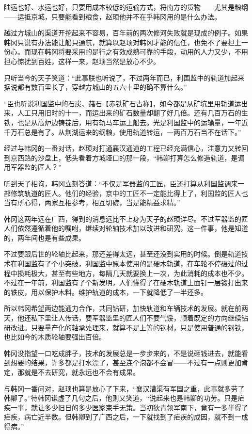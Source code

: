 陆运也好、水运也好，只要用成本较低的运输方式，将南方的货物——尤其是粮纲——运抵京城，只要能看到粮食，赵顼他并不在乎韩冈用的是什么办法。

越过方城山的渠道开挖起来不容易，百年前的两次修河失败就是现成的例子。如果韩冈只说有办法能让船只通航，就算以赵顼对韩冈才能的信任，也免不了要担上一份心。而现在韩冈将要采用的是行之有效成熟可靠的手段，动用的人力又少，不用担心惊扰到百姓，这样一来，赵顼当然是放心不少。

只听当今的天子笑道：“此事朕也听说了，不过两年而已，利国监中的轨道加起来据说都有数百里长了，穿越方城山的五六十里的确不算什么。”

“臣也听说利国监中的石炭、赭石【赤铁矿石古称】，如今都是从矿坑里用轨道运出来，人工只用旧时的十一，而运出来的矿石数量却翻了好几倍。还有几百万石的生铁，也是从高炉边铸锭后，用有轨马车运上船去。光是利国监中的运输量，一年近千万石总是有了。从荆湖运来的纲粮，使用轨道转运，一两百万石当不在话下。”

经过与韩冈的一番对话，赵顼对打通襄汉通道的工程已经充满信心，注意力又转回到京西路的沙盘上，低头看着方城垭口的那一段，“韩卿打算怎么修造轨道，是调用军器监的匠人？”

听到天子相询，韩冈立刻答道：“不仅是军器监的工匠，臣还打算从利国监调来一部修筑轨道的匠人。他们的经验，京中的工匠不一定能比得上了，利国监的匠人也当有所心得，两家互相参考，相互切磋，当是能精益求精。”

韩冈这两年远在广西，得到的消息远比不上身为天子的赵顼详尽。不过军器监的匠人们依然遵循着他的嘱咐，继续对轮轴技术加以改进和研究，这一件事，他是知道的，两年间也是有些成果。

不过要跟后世的轮轴比起来，那还差得太远，甚至还没到实用的时候。倒是轨道技术在利国监有了个小突破，利国监中原本使用的是硬木轨道，在车轮不停碾过的过程中损耗极大，甚至有些地方，每隔几天就要换上一次，为此消耗的成本也不少。不过在一年前，利国监有了个新发明，人们懂得了在硬木轨道上面钉一层锻打出来的铁皮，用以保护木料。维护轨道的成本，一下就降低了一半还多。

所以韩冈希望两边能通力合作，共同钻研，加快轨道和车辆技术的发展。就在前两天，他还私下里让人传话，要军器监里的匠人们不要气馁，顺着既定的方向继续钻研改进。只要量产化的轴承处理来，就算不是上等的钢材，只是使用普通的钢铁，也比如今的木质轮轴要强出百倍。

韩冈没指望一口吃成胖子，技术的发展总是一步步来的，不是说砸钱进去，就能看到想要的结果，许多都是打水漂了，甚至连个泡都不会冒——不过有一点则更加肯定，那就是不去研究，就永远也不会有成果。

与韩冈一番问对，赵顼也算是放心了下来，“襄汉漕渠有军国之重，此事就多劳了韩卿了。”待韩冈谦虚了几句之后，他则又笑道，“说起来也是韩卿的功劳。只是疟疾一事，就让多少旧日的多少医家束手无策。当初狄青领军南下，竟有一多半得了疟疾，病亡近半数。但韩卿到了广西之后，一下就找到了疟疾的成因，就不到一成得病。”

